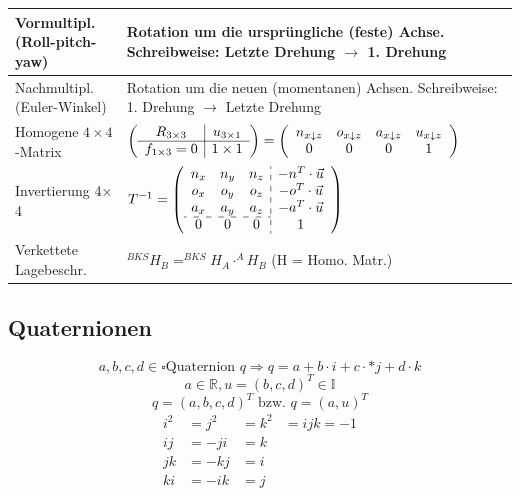 \documentclass[8pt,a4paper,landscape]{scrartcl}
\begin{document}
\begin{multicols*}{3}
\begin{tabularx}{\columnwidth}{X|m{}}
Vormultipl. (Roll-pitch-yaw) & Rotation um die ursprüngliche (feste) Achse. Schreibweise: Letzte Drehung $\rightarrow$ 1. Drehung\\ \hline
Nachmultipl. (Euler-Winkel) & Rotation um die neuen (momentanen) Achsen. Schreibweise: 1. Drehung $\rightarrow$ Letzte Drehung\\ \hline
Homogene $4\times4$-Matrix & $\left(\begin{Array}{c|c}
	R_{3\times3} & u_{3\times1}\\ \hline
	f_{1\times3} = 0 & 1\times1
\end{Array}\right) = \left(\begin{Array}{cccc}
n_{x\downarrow z} & o_{x\downarrow z} & a_{x\downarrow z} & u_{x\downarrow z}\\
0 & 0& 0 & 1
\end{Array}\right)$\\ \hline
Invertierung 4$\times$4 &  $T^{-1} = \left(\begin{Array}{ccc:c}
	n_{x} & n_{y} & n_{z} & -n^{T}\cdot\vec{u}\\
	o_{x} & o_{y} & o_{z} & -o^{T}\cdot\vec{u}\\
	a_{x} & a_{y} & a_{z} & -a^{T}\cdot\vec{u}\\ \cdashline{1-3}
	0 & 0&0&1
\end{Array}\right)$\\ \hline
Verkettete Lagebeschr.& $ ^{BKS}H_{B}  = ^{BKS}H_{A} \cdot ^{A}H_{B}$ \hfill (H = Homo. Matr.)\\ 
\end{tabularx}

\subsection*{Quaternionen}
$$a,b,c,d \in \square \text{Quaternion } q \Rightarrow q = a + b\cdot i + c \cdot * j + d \cdot k $$
$$a \in \mathbb{R}, u = (b,c,d)^T \in \mathbb{I}$$
$$q = (a,b,c,d)^T \text{ bzw. } q=(a,u)^T$$
\begin{alignat*}{3}
	i^2 &= j^2 &= k^2 &= ijk = -1\\
	ij &= -ji &= k\\
	jk &= -kj &= i\\
	ki &= -ik &= j
\end{alignat*}


\end{multicols*}
\end{document}

